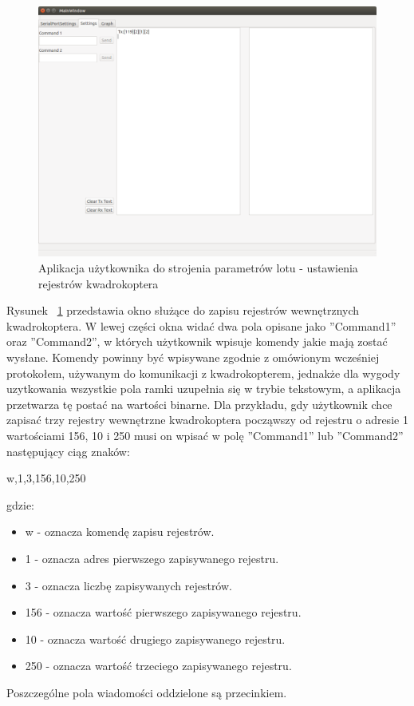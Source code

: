 \begin{figure}[H]
	\centering
	\includegraphics[scale=0.4]{Pictures/QuadroTune/QuadroTuneSettings.png}
	\caption[Aplikacja użytkownika do strojenia parametrów lotu - ustawienia rejestrów kwadrokoptera]{Aplikacja użytkownika do strojenia parametrów lotu - ustawienia rejestrów kwadrokoptera}
	\label{fig:QuadroTune_screen2}
\end{figure}

Rysunek ~\ref{fig:QuadroTune_screen2} przedstawia okno służące do zapisu rejestrów wewnętrznych kwadrokoptera. W lewej części okna widać dwa pola opisane jako ''Command1'' oraz ''Command2'', w których użytkownik wpisuje komendy jakie mają zostać wysłane. Komendy powinny być wpisywane zgodnie z omówionym wcześniej protokołem, używanym do komunikacji z kwadrokopterem, jednakże dla wygody uzytkowania wszystkie pola ramki uzupełnia się w trybie tekstowym, a aplikacja przetwarza tę postać na wartości binarne. Dla przykładu, gdy użytkownik chce zapisać trzy rejestry wewnętrzne kwadrokoptera począwszy od rejestru o adresie 1 wartościami 156, 10 i 250 musi on wpisać w polę ''Command1'' lub ''Command2'' następujący ciąg znaków:

w,1,3,156,10,250

gdzie:
\begin{itemize}
	\item w - oznacza komendę zapisu rejestrów.
	\item 1 - oznacza adres pierwszego zapisywanego rejestru.
	\item 3 - oznacza liczbę zapisywanych rejestrów.
	\item 156 - oznacza wartość pierwszego zapisywanego rejestru.
	\item 10 - oznacza wartość drugiego zapisywanego rejestru.
	\item 250 - oznacza wartość trzeciego zapisywanego rejestru.
\end{itemize}
Poszczególne pola wiadomości oddzielone są przecinkiem.

